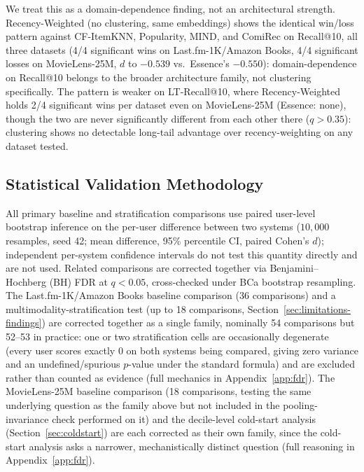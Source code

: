 \documentclass{article}
\begin{document}
We treat this as a domain-dependence finding, not an architectural strength. Recency-Weighted (no clustering, same embeddings) shows the identical win/loss pattern against CF-ItemKNN, Popularity, MIND, and ComiRec on Recall@10, all three datasets (4/4 significant wins on Last.fm-1K/Amazon Books, 4/4 significant losses on MovieLens-25M, $d$ to $-0.539$ vs.\ Essence's $-0.550$): domain-dependence on Recall@10 belongs to the broader architecture family, not clustering specifically. The pattern is weaker on LT-Recall@10, where Recency-Weighted holds 2/4 significant wins per dataset even on MovieLens-25M (Essence: none), though the two are never significantly different from each other there ($q>0.35$): clustering shows no detectable long-tail advantage over recency-weighting on any dataset tested.

\subsection{Statistical Validation Methodology}
\label{sec:stats-methodology}

All primary baseline and stratification comparisons use paired user-level bootstrap inference on the per-user difference between two systems ($10{,}000$ resamples, seed 42; mean difference, 95\% percentile CI, paired Cohen's $d$); independent per-system confidence intervals do not test this quantity directly and are not used. Related comparisons are corrected together via Benjamini--Hochberg (BH) FDR at $q<0.05$, cross-checked under BCa bootstrap resampling. The Last.fm-1K/Amazon Books baseline comparison (36 comparisons) and a multimodality-stratification test (up to 18 comparisons, Section~\ref{sec:limitations-findings}) are corrected together as a single family, nominally 54 comparisons but 52--53 in practice: one or two stratification cells are occasionally degenerate (every user scores exactly 0 on both systems being compared, giving zero variance and an undefined/spurious $p$-value under the standard formula) and are excluded rather than counted as evidence (full mechanics in Appendix~\ref{app:fdr}). The MovieLens-25M baseline comparison (18 comparisons, testing the same underlying question as the family above but not included in the pooling-invariance check performed on it) and the decile-level cold-start analysis (Section~\ref{sec:coldstart}) are each corrected as their own family, since the cold-start analysis asks a narrower, mechanistically distinct question (full reasoning in Appendix~\ref{app:fdr}).
\end{document}

